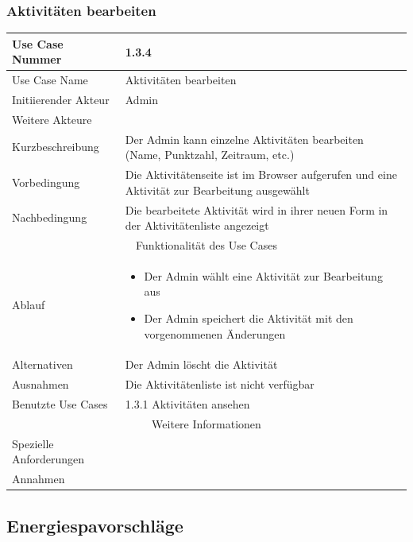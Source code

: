 \documentclass[10pt,a4paper]{article}
\begin{document}
	\subsubsection{Aktivit\"aten bearbeiten}
	\begin{tabularx}{\textwidth}{|l|X|}
	\hline Use Case Nummer & 1.3.4 \\ 
	\hline Use Case Name & Aktivit\"aten bearbeiten \\ 
	\hline Initiierender Akteur & Admin \\
	\hline Weitere Akteure & \\
	\hline Kurzbeschreibung & Der Admin kann einzelne Aktivit\"aten bearbeiten (Name, Punktzahl, Zeitraum, etc.) \\
	\hline Vorbedingung & Die Aktivit\"atenseite ist im Browser aufgerufen und eine Aktivit\"at zur Bearbeitung ausgew\"ahlt \\
	\hline Nachbedingung & Die bearbeitete Aktivit\"at wird in ihrer neuen Form in der Aktivit\"atenliste angezeigt \\
	\hline \multicolumn{2}{|c|}{Funktionalität des Use Cases}\\
	\hline Ablauf & \begin{itemize}
			\item Der Admin w\"ahlt eine Aktivit\"at zur Bearbeitung aus
			\item Der Admin speichert die Aktivit\"at mit den vorgenommenen \"Anderungen
		\end{itemize} \\
	\hline Alternativen & Der Admin l\"oscht die Aktivit\"at \\
	\hline Ausnahmen & Die Aktivit\"atenliste ist nicht verf\"ugbar \\
	\hline Benutzte Use Cases & 1.3.1 Aktivit\"aten ansehen \\
	\hline \multicolumn{2}{|c|}{Weitere Informationen} \\
	\hline Spezielle Anforderungen & \\
	\hline Annahmen & \\
	\hline
	\end{tabularx} 

\subsection{Energiespavorschl\"age}
\end{document}
